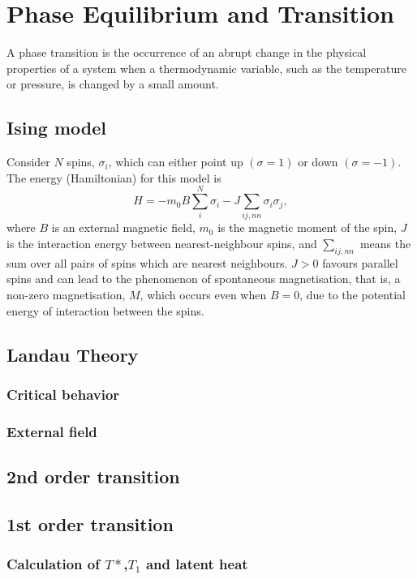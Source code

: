\documentclass[12pt,a4paper]{article}
\begin{document}
\section{Phase Equilibrium and Transition}
A phase transition is the occurrence of an abrupt change in the physical properties of a system when a thermodynamic variable, such as the temperature or pressure, is changed by a small amount.
\subsection{Ising model}
Consider $N$ spins, $\sigma_i$, which can either point up $(\sigma=1)$ or down $(\sigma=-1)$. The energy (Hamiltonian) for this model is
$$
H=-m_0 B \sum_i^N \sigma_i-J \sum_{i j, n n} \sigma_i \sigma_j,
$$
where $B$ is an external magnetic field, $m_0$ is the magnetic moment of the spin, $J$ is the interaction energy between nearest-neighbour spins, and $\sum_{i j, n n}$ means the sum over all pairs of spins which are nearest neighbours. $J>0$ favours parallel spins and can lead to the phenomenon of spontaneous magnetisation, that is, a non-zero magnetisation, $M$, which occurs even when $B=0$, due to the potential energy of interaction between the spins.
\subsection{Landau Theory}
\subsubsection{Critical behavior}
\subsubsection{External field}
\subsection{2nd order transition}
\subsection{1st order transition}
\subsubsection{Calculation of $T*$,$T_1$ and latent heat}
\end{document}

